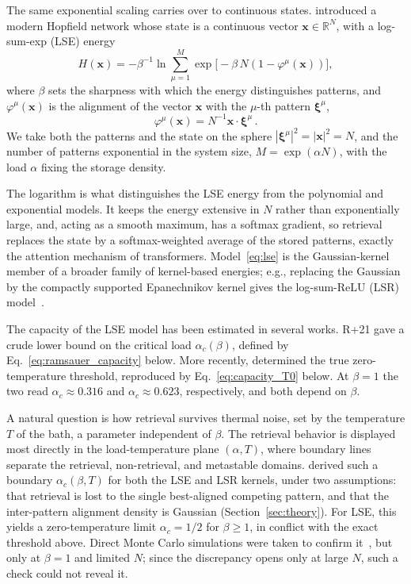\documentclass[letterpaper]{article} %
\newcommand{\bxi}{\boldsymbol{\xi}}
\newcommand{\bx}{\bm{x}}
\newcommand{\Bnet}{\beta}
\begin{document}
The same exponential scaling carries over to continuous states. \citet[][hereafter R+21]{ramsauer2021hopfield} introduced a modern Hopfield network whose state is a continuous vector $\bx \in \mathbb{R}^N$, with a log-sum-exp (LSE) energy
\begin{equation}
H(\bx) = -\Bnet^{-1}\ln\sum_{\mu=1}^{M}\exp\!\big[-\Bnet\,N (1-\varphi^\mu(\bx)) \big],
\label{eq:lse}
\end{equation}
where $\Bnet$ sets the sharpness with which the energy distinguishes patterns, and $\varphi^\mu(\bx)$ is the alignment of the vector $\bx$ with the $\mu$-th pattern $\bxi^\mu$,
\begin{equation}
    \varphi^\mu(\bm{x}) = N^{-1} \bm{x} \cdot \bm{\xi}^\mu\,.
    \label{eq:alignment}
\end{equation}
We take both the patterns and the state on the sphere $|\bxi^\mu|^2 = |\bx|^2 = N$, and the number of patterns exponential in the system size, $M = \exp(\alpha N)$, with the load $\alpha$ fixing the storage density.

The logarithm is what distinguishes the LSE energy from the polynomial and exponential models. It keeps the energy extensive in $N$ rather than exponentially large, and, acting as a smooth maximum, has a softmax gradient, so retrieval replaces the state by a softmax-weighted average of the stored patterns, exactly the attention mechanism of transformers. Model~\eqref{eq:lse} is the Gaussian-kernel member of a broader family of kernel-based energies; e.g., replacing the Gaussian by the compactly supported Epanechnikov kernel gives the log-sum-ReLU (LSR) model~\citep{hoover2025dense}.

The capacity of the LSE model has been estimated in several works. R+21 gave a crude lower bound on the critical load $\alpha_c(\Bnet)$, defined by Eq.~\eqref{eq:ramsauer_capacity} below. More recently, \citet[][hereafter LM24]{lucibello2024exponential} determined the true zero-temperature threshold, reproduced by Eq.~\eqref{eq:capacity_T0} below. At $\Bnet=1$ the two read $\alpha_c \approx 0.316$ and $\alpha_c \approx 0.623$, respectively, and both depend on $\Bnet$.

A natural question is how retrieval survives thermal noise, set by the temperature $T$ of the bath, a parameter independent of $\Bnet$. The retrieval behavior is displayed most directly in the load-temperature plane $(\alpha, T)$, where boundary lines separate the retrieval, non-retrieval, and metastable domains. \citet[][hereafter PPS26]{icml2026theory} derived such a boundary $\alpha_c(\Bnet, T)$ for both the LSE and LSR kernels, under two assumptions: that retrieval is lost to the single best-aligned competing pattern, and that the inter-pattern alignment density is Gaussian (Section~\ref{sec:theory}). For LSE, this yields a zero-temperature limit $\alpha_c = 1/2$ for $\Bnet\ge 1$, in conflict with the exact threshold above. Direct Monte Carlo simulations were taken to confirm it~\citep{iclr2026mc}, but only at $\Bnet=1$ and limited $N$; since the discrepancy opens only at large $N$, such a check could not reveal it.
\end{document}
